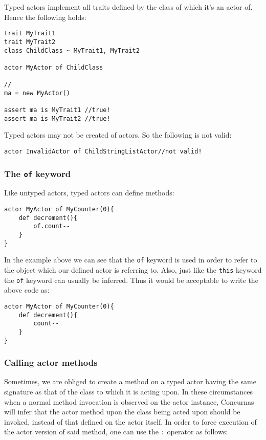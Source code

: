\documentclass[conc-doc]{subfiles}
\begin{document}
Typed actors implement all traits defined by the class of which it's an actor of. Hence the following holds:

\begin{lstlisting}
trait MyTrait1
trait MyTrait2
class ChildClass ~ MyTrait1, MyTrait2

actor MyActor of ChildClass

//
ma = new MyActor()

assert ma is MyTrait1 //true!
assert ma is MyTrait2 //true!
\end{lstlisting}

Typed actors may not be created of actors. So the following is not valid:

\begin{lstlisting}
actor InvalidActor of ChildStringListActor//not valid!
\end{lstlisting}

\subsubsection{The \lstinline!of! keyword}
\label{subsubsec:ofKeyword}
Like untyped actors, typed actors can define methods:

\begin{lstlisting}
actor MyActor of MyCounter(0){
	def decrement(){
		of.count--
	}
}
\end{lstlisting}

In the example above we can see that the \lstinline{of} keyword is used in order to refer to the object which our defined actor is referring to. Also, just like the \lstinline{this} keyword the \lstinline{of} keyword can usually be inferred. Thus it would be acceptable to write the above code as:

\begin{lstlisting}
actor MyActor of MyCounter(0){
	def decrement(){
		count--
	}
}
\end{lstlisting}

\subsubsection{Calling actor methods}
Sometimes, we are obliged to create a method on a typed actor having the same signature as that of the class to which it is acting upon. In these circumstances when a normal method invocation is observed on the actor instance, Concurnas will infer that the actor method upon the class being acted upon should be invoked, instead of that defined on the actor itself. In order to force execution of the actor version of said method, one can use the \lstinline{:} operator as follows:
\end{document}
